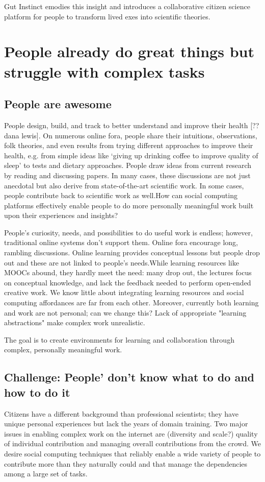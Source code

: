 Gut Instinct emodies this insight and introduces a collaborative citizen science platform for people to transform lived exes into scientific theories. 

\section {People already do great things but struggle with complex tasks}

\subsection{People are awesome}
People design, build, and track to better understand and improve their health [?? dana lewis].  On numerous online fora, people share their intuitions, observations, folk theories, and even results from trying different approaches to improve their health, e.g. from simple ideas like ‘giving up drinking coffee to improve quality of sleep’ to tests and dietary approaches. People draw ideas from current research by reading and discussing papers. In many cases, these discussions are not just anecdotal but also derive from state-of-the-art scientific work. In some cases, people contribute back to scientific work as well.How can social computing platforms effectively enable people to do more personally meaningful work built upon their experiences and insights?

People’s curiosity, needs, and possibilities to do useful work is endless; however, traditional online systems don’t support them. Online fora encourage long, rambling discussions. Online learning provides conceptual lessons but people drop out and these are not linked to people’s needs.While learning resources like MOOCs abound, they hardly meet the need: many drop out, the lectures focus on conceptual knowledge, and lack the feedback needed to perform open-ended creative work. We know little about integrating learning resources and social computing affordances are far from each other. Moreover, currently both learning and work are not personal; can we change this? Lack of appropriate "learning abstractions" make complex work unrealistic.

The goal is to create environments for learning and collaboration through complex, personally meaningful work.

\subsection{Challenge: People' don't know what to do and how to do it}
Citizens have a different background than professional scientists; they have unique
 personal experiences but lack the years of domain training. Two major issues in 
enabling complex work on the internet are (diversity and scale?) 
quality of individual contribution and managing overall contributions from the crowd.
We desire social computing techniques that reliably enable a wide variety of people to 
contribute more than they naturally could and that manage the dependencies among
 a large set of tasks.


